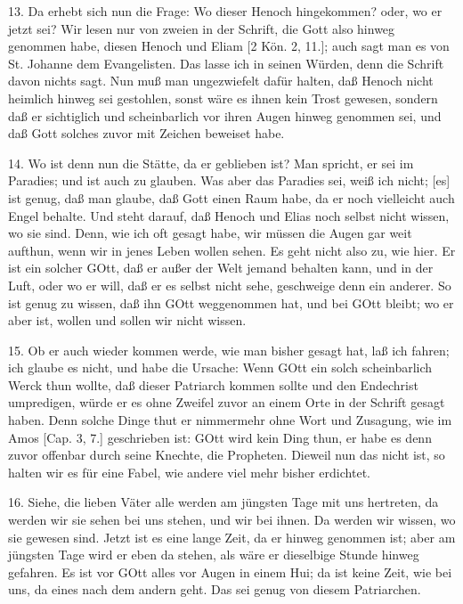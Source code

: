 13. Da erhebt sich nun die Frage: Wo dieser Henoch hingekommen? oder, wo er jetzt sei? Wir lesen nur von zweien in der Schrift, die Gott also hinweg genommen habe, diesen Henoch und Eliam [2 Kön. 2, 11.]; auch sagt man es von St. Johanne dem Evangelisten. Das lasse ich in seinen Würden, denn die Schrift davon nichts sagt. Nun muß man ungezwiefelt dafür halten, daß Henoch nicht heimlich hinweg sei gestohlen, sonst wäre es ihnen kein Trost gewesen, sondern daß er sichtiglich und scheinbarlich vor ihren Augen hinweg genommen sei, und daß Gott solches zuvor mit Zeichen beweiset habe.

14. Wo ist denn nun die Stätte, da er geblieben ist? Man spricht, er sei im Paradies; und ist auch zu glauben. Was aber das Paradies sei, weiß ich nicht; [es] ist genug, daß man glaube, daß Gott einen Raum habe, da er noch vielleicht auch Engel behalte. Und steht darauf, daß Henoch und Elias noch selbst nicht wissen, wo sie sind. Denn, wie ich oft gesagt habe, wir müssen die Augen gar weit aufthun, wenn wir in jenes Leben wollen sehen. Es geht nicht
also zu, wie hier. Er ist ein solcher GOtt, daß er außer der Welt jemand behalten kann, und in der Luft, oder wo er will, daß er es selbst nicht sehe, geschweige denn ein anderer. So ist genug zu wissen, daß ihn GOtt weggenommen hat, und bei GOtt bleibt; wo er aber ist, wollen und sollen wir nicht wissen.

15. Ob er auch wieder kommen werde, wie man bisher gesagt hat, laß ich fahren; ich glaube es nicht, und habe die Ursache: Wenn GOtt ein solch scheinbarlich Werck thun wollte, daß dieser Patriarch kommen sollte und den Endechrist umpredigen, würde er es ohne Zweifel zuvor an einem Orte in der Schrift gesagt haben. Denn solche Dinge thut er nimmermehr ohne Wort und Zusagung, wie im Amos [Cap. 3, 7.] geschrieben ist: GOtt wird kein Ding thun, er habe es denn zuvor offenbar durch seine Knechte, die Propheten. Dieweil nun das nicht ist, so halten wir es für eine Fabel, wie andere viel mehr bisher erdichtet.

16. Siehe, die lieben Väter alle werden am jüngsten Tage mit uns hertreten, da werden wir sie sehen bei uns stehen, und wir bei ihnen. Da werden wir wissen, wo sie gewesen sind. Jetzt ist es eine lange Zeit, da er hinweg genommen ist; aber am jüngsten Tage wird er eben da stehen, als wäre er dieselbige Stunde hinweg gefahren. Es ist vor GOtt alles vor Augen in einem Hui; da ist keine Zeit, wie bei uns, da eines nach dem andern geht. Das sei genug von diesem Patriarchen.

